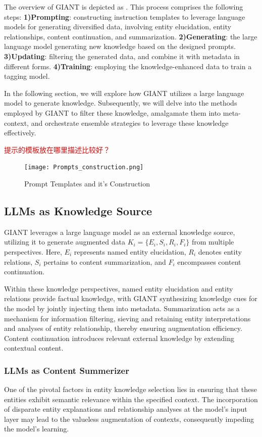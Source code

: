  
 The overview of GIANT is depicted as .
 This process comprises the following steps:
 \textbf{1)Prompting}: constructing instruction templates to leverage language models for generating diversified data, involving entity elucidation, entity relationships, content continuation, and summarization.
 \textbf{2)Generating}: the large language model generating new knowledge based on the designed prompts.
 \textbf{3)Updating}: filtering the generated data, and combine it with metadata in different forms.
 \textbf{4)Training}: employing the knowledge-enhanced data to train a tagging model.

 In the following section, we will explore how GIANT utilizes a large language model to generate knowledge. Subsequently, we will delve into the methods employed by GIANT to filter these knowledge, amalgamate them into meta-context, and orchestrate ensemble strategies to leverage these knowledge effectively.

\textcolor{red}{提示的模板放在哪里描述比较好？}
\label{sec:prompt_construction}
\begin{figure}[h]
	\centering
	\texttt{[image: Prompts\_construction.png]}
	\caption{Prompt Templates and it's Construction}
	\label{fig:prompt_template}
\end{figure}   

\subsection{LLMs as Knowledge Source}
\label{sec:llm_as_knowledge_source}
 GIANT leverages a large language model as an external knowledge source, utilizing it to generate augmented data $K_i = \{E_i, S_i, R_i, F_i\}$ from multiple perspectives. Here, $E_i$ represents named entity elucidation, $R_i$ denotes entity relations, $S_i$ pertains to content summarization, and $F_i$ encompasses content continuation.

 Within these knowledge perspectives, named entity elucidation and entity relations provide factual knowledge, with GIANT synthesizing knowledge cues for the model by jointly injecting them into metadata.
 Summarization acts as a mechanism for information filtering, sieving and retaining entity interpretations and analyses of entity relationship, thereby ensuring augmentation efficiency. 
 Content continuation introduces relevant external knowledge by extending contextual content.
 
\subsubsection{LLMs as Content Summerizer}
 One of the pivotal factors in entity knowledge selection lies in ensuring that these entities exhibit semantic relevance within the specified context. The incorporation of disparate entity explanations and relationship analyses at the model's input layer may lead to the valueless augmentation of contexts, consequently impeding the model's learning.
 
